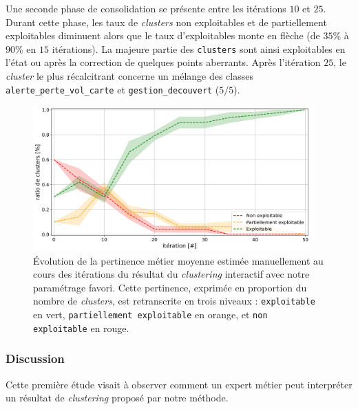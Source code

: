 			Une seconde phase de consolidation se présente entre les itérations $10$ et $25$.
			Durant cette phase, les taux de \textit{clusters} non exploitables et de partiellement exploitables diminuent alors que le taux d'exploitables monte en flèche (de $35$\% à $90$\% en $15$ itérations).
			La majeure partie des \texttt{clusters} sont ainsi exploitables en l'état ou après la correction de quelques points aberrants.
			Après l'itération $25$, le \textit{cluster} le plus récalcitrant concerne un mélange des classes \texttt{alerte\_perte\_vol\_carte} et \texttt{gestion\_decouvert} ($5/5$).

			\begin{figure}[!htb]
				\centering
				\includegraphics[width=0.95\textwidth]{figures/etude-pertinence-llm-check-clustering-annotation-favori}
				\caption{Évolution de la pertinence métier moyenne estimée manuellement au cours des itérations du résultat du \textit{clustering} interactif avec notre paramétrage favori.
				Cette pertinence, exprimée en proportion du nombre de \textit{clusters}, est retranscrite en trois niveaux : \texttt{exploitable} en vert, \texttt{partiellement exploitable} en orange, et \texttt{non exploitable} en rouge.}
				\label{figure:4.4.1-ETUDE-PERTINENCE-VERIFICATION-MANUELLE}
			\end{figure}


		\subsubsection{Discussion}
		
			Cette première étude visait à observer comment un expert métier peut interpréter un résultat de \textit{clustering} proposé par notre méthode.
			
